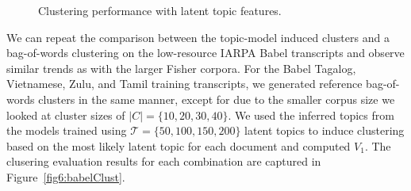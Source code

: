 \begin{figure}
\begin{center}
\hfill
{}
\end{center}
\caption[Clustering performance with latent topic features]{Clustering performance with latent topic features. \label{fig6:topicClusts}}

\end{figure}

We can repeat the comparison between the topic-model induced clusters and a bag-of-words clustering on the low-resource IARPA Babel transcripts and observe similar trends as with the larger Fisher corpora.  For the Babel Tagalog, Vietnamese, Zulu, and Tamil training transcripts, we generated reference bag-of-words clusters in the same manner, except for due to the smaller corpus size we looked at cluster sizes of $|C|=\{10,20,30,40\}$.  We used the inferred topics from the models trained using $\mathcal{T}=\{50,100,150,200\}$ latent topics to induce clustering based on the most likely latent topic for each document and computed $V_1$.   The clusering evaluation results for each combination are captured in Figure~\ref{fig6:babelClust}.


